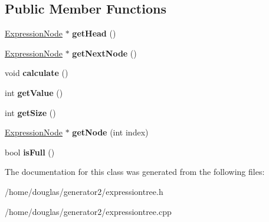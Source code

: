 \subsection*{Public Member Functions}
\begin{DoxyCompactItemize}
\item 
\hyperlink{classExpressionNode}{Expression\+Node} $\ast$ {\bfseries get\+Head} ()\hypertarget{classExpressionTree_ad33a9486b731445db5b0a310ae1dccbc}{}\label{classExpressionTree_ad33a9486b731445db5b0a310ae1dccbc}

\item 
\hyperlink{classExpressionNode}{Expression\+Node} $\ast$ {\bfseries get\+Next\+Node} ()\hypertarget{classExpressionTree_a4c0be98d48d6a40bd0040e9ba6182da0}{}\label{classExpressionTree_a4c0be98d48d6a40bd0040e9ba6182da0}

\item 
void {\bfseries calculate} ()\hypertarget{classExpressionTree_a013e231688894895d6115947f51fc9ec}{}\label{classExpressionTree_a013e231688894895d6115947f51fc9ec}

\item 
int {\bfseries get\+Value} ()\hypertarget{classExpressionTree_aba1a8fe6a222342f2cc63fef28b6f3fc}{}\label{classExpressionTree_aba1a8fe6a222342f2cc63fef28b6f3fc}

\item 
int {\bfseries get\+Size} ()\hypertarget{classExpressionTree_a4c056d4c509602b0ec0bb230a4bcae57}{}\label{classExpressionTree_a4c056d4c509602b0ec0bb230a4bcae57}

\item 
\hyperlink{classExpressionNode}{Expression\+Node} $\ast$ {\bfseries get\+Node} (int index)\hypertarget{classExpressionTree_a249c0b529ab05f8b554b2b6d9002ce9b}{}\label{classExpressionTree_a249c0b529ab05f8b554b2b6d9002ce9b}

\item 
bool {\bfseries is\+Full} ()\hypertarget{classExpressionTree_af7bb11b664bd228c68ba81d557bc1f11}{}\label{classExpressionTree_af7bb11b664bd228c68ba81d557bc1f11}

\end{DoxyCompactItemize}


The documentation for this class was generated from the following files\+:\begin{DoxyCompactItemize}
\item 
/home/douglas/generator2/expressiontree.\+h\item 
/home/douglas/generator2/expressiontree.\+cpp\end{DoxyCompactItemize}
